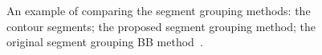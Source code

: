 \documentclass{lutmscthesis}[2010/09/22]
\begin{document}
\begin{figure}[htp]
    \centering
    
    \\
    \\
    
    \caption[]{
        An example of comparing the segment grouping methods:
         the contour segments;
         the proposed segment grouping method;
         the original segment grouping BB method~\cite{zafari-bb}.
    }
         
    \label{fig:comparing}
\end{figure}
\end{document}

